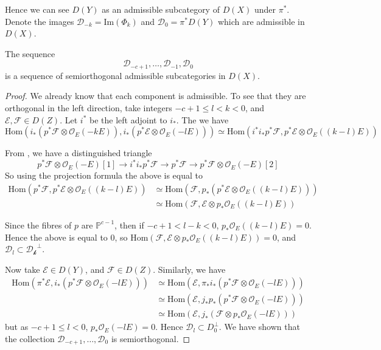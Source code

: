 Hence we can see $D(Y)$ as an admissible subcategory of $D(X)$ under $\pi^*$. Denote the images $\mathcal{D}_{-k}=\mathrm{Im}(\Phi_{k})$ and $\mathcal{D}_{0}= \pi^{*}D(Y)$ which are admissible in $D(X)$. 

\begin{lemma}{}{}
    The sequence $$\mathcal{D}_{-c+1},\dots,\mathcal{D}_{-1},\mathcal{D}_0$$is a sequence of semiorthogonal admissible subcategories in $D(X)$.
\end{lemma}


\begin{proof}
We already know that each component is admissible. To see that they are orthogonal in the left direction, take integers $-c+1 \leq l <k <0$, and $\mathcal{E}, \mathcal{F}\in D(Z)$. Let $i^*$ be the left adjoint to $i_*$. The we have $$\mathrm{Hom}(i_{*}\left( p^{*}\mathcal{F}\otimes \mathcal{O}_{E}(-kE) \right), i_{*}\left( p^{*}\mathcal{E}\otimes \mathcal{O}_{E}(-lE) \right)  ) \simeq \mathrm{Hom}(i^{*}i_{*}p^{*}\mathcal{F}, p^{*}\mathcal{E}\otimes \mathcal{O}_{E}((k-l)E))$$

From \cite[Corollary~11.4]{Huybrechts}, we have a distinguished triangle $$p^{*}\mathcal{F}\otimes  \mathcal{O}_{E}(-E)[1]\to i^{*}i_{*}p^{*}\mathcal{F}\to p^{*}\mathcal{F}\to p^{*}\mathcal{F}\otimes \mathcal{O}_E(-E)[2]$$
So using the projection formula the above is equal to
\begin{align*}
\mathrm{Hom}(p^{*}\mathcal{F},p^{*}\mathcal{E} \otimes  \mathcal{O}_{E}((k-l)E)) &\simeq \mathrm{Hom}(\mathcal{F},p_{*}(p^{*}\mathcal{E} \otimes  \mathcal{O}_{E}((k-l)E)))  \\
&\simeq \mathrm{Hom}(\mathcal{F},\mathcal{E} \otimes p_{*} \mathcal{O}_{E}((k-l)E)) 
\end{align*}

Since the fibres of $p$ are $\mathbb{P}^{c-1}$, then if $-c+1<l-k<0$, $p_{*}\mathcal{O}_{E}((k-l)E)=0$. Hence the above is equal to 0, so $\mathrm{Hom}(\mathcal{F},\mathcal{E} \otimes p_{*} \mathcal{O}_{E}((k-l)E)) =0$, and $\mathcal{D}_{l}\subset \mathcal{D_k}^\perp$.

Now take $\mathcal{E}\in D(Y)$, and $\mathcal{F}\in D(Z)$. Similarly, we have
\begin{align*}
\mathrm{Hom}(\pi^{*}\mathcal{E},i_{*}(p^{*}\mathcal{F}\otimes \mathcal{O}_{E}(-lE))) &\simeq \mathrm{Hom}(\mathcal{E},\pi_{*}i_{*}(p^{*}\mathcal{F}\otimes \mathcal{O}_{E}(-lE))) \\
&\simeq \mathrm{Hom}(\mathcal{E},j_{*}p_{*}(p^{*}\mathcal{F}\otimes \mathcal{O}_{E}(-lE)))  \\
&\simeq \mathrm{Hom}(\mathcal{E},j_{*}(\mathcal{F}\otimes p_{*}\mathcal{O}_{E}(-lE))) 
\end{align*}
but as $-c+1\leq l<0$, $p_{*}\mathcal{O}_{E}(-lE)=0$. Hence $\mathcal{D}_{l}\subset D_{0}^\perp$. We have shown that the collection $\mathcal{D}_{-c+1},\dots,\mathcal{D}_0$ is semiorthogonal.  
\end{proof}


